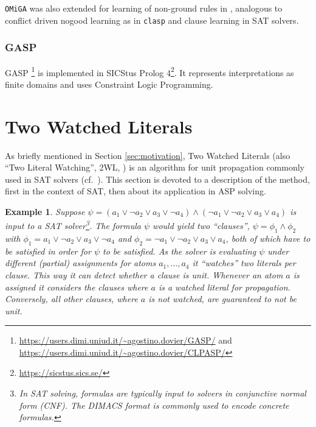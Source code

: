 \documentclass{vutinfth} %
\newtheorem{example}{Example}[chapter]
\newcommand{\clasp}{\texttt{clasp}\xspace}
\newcommand{\omiga}{\texttt{OMiGA}\xspace}
\begin{document}
\omiga was also extended for learning of non-ground rules in \cite{nglearn}, analogous to conflict driven nogood learning as in \clasp and clause learning in SAT solvers.

\subsubsection{GASP}

GASP \cite{gasp,gasp2}\footnote{\url{https://users.dimi.uniud.it/~agostino.dovier/GASP/} and\\ \url{https://users.dimi.uniud.it/~agostino.dovier/CLPASP/}} is implemented in SICStus Prolog 4\footnote{\url{https://sicstus.sics.se/}}. It represents interpretations as finite domains and uses Constraint Logic Programming.



\section{Two Watched Literals}
\label{sec:2wl}

As briefly mentioned in Section \ref{sec:motivation}, Two Watched Literals (also \enquote{Two Literal Watching}, 2WL, \cite{effsat,questsat}) is an algorithm for unit propagation commonly used in SAT solvers (cf.~\cite[Section 2.2.2, p.~94]{handbook-sat}). This section is devoted to a description of the method, first in the context of SAT, then about its application in ASP solving.

\begin{example}
\label{ex:clause-prop}
Suppose $\psi = (a_1 \vee \neg a_2 \vee a_3 \vee \neg a_4) \wedge (\neg a_1 \vee \neg a_2 \vee a_3 \vee a_4)$ is input to a SAT solver\footnote{In SAT solving, formulas are typically input to solvers in conjunctive normal form (CNF). The DIMACS format is commonly used to encode concrete formulas.}. The formula $\psi$ would yield two \enquote{clauses}, $\psi = \phi_1 \wedge \phi_2$ with $\phi_1 = a_1 \vee \neg a_2 \vee a_3 \vee \neg a_4$ and $\phi_2 = \neg a_1 \vee \neg a_2 \vee a_3 \vee a_4$, both of which have to be satisfied in order for $\psi$ to be satisfied. As the solver is evaluating $\psi$ under different (partial) assignments for atoms $a_1, \ldots, a_4$ it \enquote{watches} two literals per clause. This way it can detect whether a clause is unit. Whenever an atom $a$ is assigned it considers the clauses where $a$ is a watched literal for propagation. Conversely, all other clauses, where $a$ is not watched, are guaranteed to not be unit.
\end{example}
\end{document}

